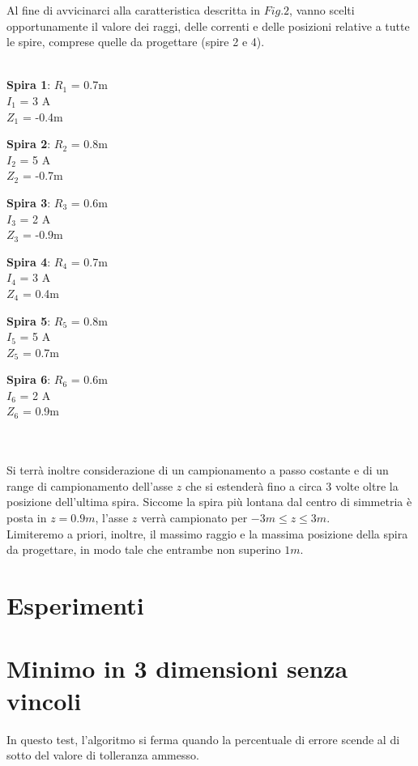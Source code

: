 \documentclass[a4paper, 11pt]{article}
\begin{document}
Al fine di avvicinarci alla caratteristica descritta in $Fig. 2$, vanno scelti
opportunamente il valore dei raggi, delle correnti e delle posizioni relative a
tutte le spire, comprese quelle da progettare (spire 2 e 4). \\ \\
\centerline{ \textbf{Spira 1}: $R_{1}$ = 0.7m \\ $I_{1}$ = 3 A \\ $Z_{1}$ = -0.4m} 
\centerline{ \textbf{Spira 2}: $R_{2}$ = 0.8m \\ $I_{2}$ = 5 A \\ $Z_{2}$ = -0.7m}
\centerline{ \textbf{Spira 3}: $R_{3}$ = 0.6m \\ $I_{3}$ = 2 A \\ $Z_{3}$ = -0.9m}
\centerline{ \textbf{Spira 4}: $R_{4}$ = 0.7m \\ $I_{4}$ = 3 A \\ $Z_{4}$ = 0.4m}
\centerline{ \textbf{Spira 5}: $R_{5}$ = 0.8m \\ $I_{5}$ = 5 A \\ $Z_{5}$ = 0.7m}
\centerline{ \textbf{Spira 6}: $R_{6}$ = 0.6m \\ $I_{6}$ = 2 A \\ $Z_{6}$ = 0.9m}
\\ \\
\noindent
Si terrà inoltre considerazione di un campionamento a passo costante e di un
range di campionamento dell'asse $z$ che si estenderà fino a circa 3 volte oltre
la posizione dell'ultima spira. Siccome la spira più lontana dal centro di
simmetria è posta in $z = 0.9 m$, l'asse $z$ verrà campionato per $-3 m \le z \le
3 m$. \\
Limiteremo a priori, inoltre, il massimo raggio e la massima posizione della
spira da progettare, in modo tale che entrambe non superino $1 m$.

\section*{Esperimenti}
\section{Minimo in 3 dimensioni senza vincoli}

In questo test, l'algoritmo si ferma quando la percentuale di errore scende al
di sotto del valore di tolleranza ammesso.
\end{document}

